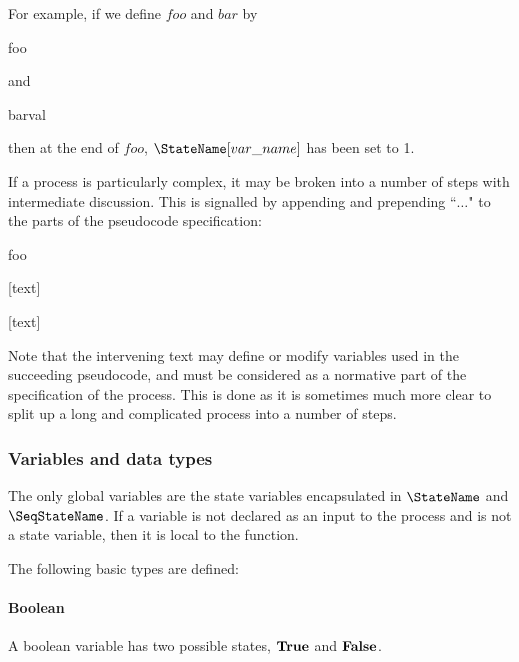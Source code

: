 For example, if we define $foo$ and $bar$ by

\begin{pseudo}{foo}{}
\end{pseudo}

and 

\begin{pseudo}{bar}{val}
\end{pseudo}

then at the end of $foo$, $\StateName[var\_name]$ has been set to 1.

If a process is particularly complex, it may be broken into a number of steps with 
intermediate discussion. This is signalled by appending  and prepending ``$\hdots$" to
the parts of the pseudocode specification:

\begin{pseudo}{foo}{}
\bsCODE{\hdots}
\end{pseudo}

[text]

\begin{pseudo*}
\bsCODE{\hdots}
\bsCODE{\hdots}
\end{pseudo*}

[text]

\begin{pseudo*}
\bsCODE{\hdots}
\end{pseudo*}

Note that the intervening text may define or modify variables used in the succeeding
pseudocode, and must be considered as a normative part of the specification of the process.
This is done as it is sometimes much more clear to split up a long and complicated process
into a number of steps.

\subsubsection{Variables and data types}
\label{datatypes}

The only global variables are the state variables encapsulated in $\StateName$
and $\SeqStateName$. If a variable is not declared as an input to
the process and is not a state variable, then it is local to the function.

The following basic types are defined:

\paragraph*{Boolean} A boolean variable has two possible states, $\text{\bf{True}}$ and $\text{\bf{False}}$.

